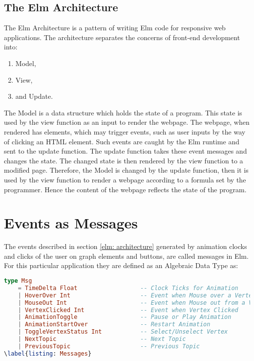 \subsection{The Elm Architecture}
\label{elm: architecture}
The Elm Architecture is a pattern of writing Elm code for responsive web
applications.  The architecture separates the concerns of front-end development
into:

\begin{enumerate}
\item Model,
\item View,
\item and Update.
\end{enumerate}

The Model is a data structure which holds the state of a program.
\cite{Fairbank19} This state is used by the view function as an input to
render the webpage.  The webpage, when rendered has elements, which may trigger
events, such as user inputs by the way of clicking an HTML element. Such events
are caught by the Elm runtime and sent to the update function.  The update
function takes these event messages and changes the state. The changed state is
then rendered by the view function to a modified page.  Therefore, the Model is
changed by the update function, then it is used by the view function to
render a webpage according to a formula set by the programmer. Hence the content
of the webpage reflects the state of the program.


\section{Events as Messages}
\label{impl: messages}
The events described in section \autoref{elm: architecture} generated by
animation clocks and clicks of the user on graph elements and buttons, are
called messages in Elm. For this particular
application they are defined as an Algebraic Data Type as:

\begin{lstlisting}[language=elm
                  , caption={
                              Abstract Data Type Msg with its Data Constructors.
                              These messages are dispached by buttons, graph vertices
                              system clocks and are received by the update function
                              to change the $Model$, which carries the state of the
                              program.
                  }
                  ]
type Msg
    = TimeDelta Float                  -- Clock Ticks for Animation
    | HoverOver Int                    -- Event when Mouse over a Vertex                              
    | MouseOut Int                     -- Event when Mouse out from a Vertex                               
    | VertexClicked Int                -- Event when Vertex Clicked                              
    | AnimationToggle                  -- Pause or Play Animation
    | AnimationStartOver               -- Restart Animation
    | ToggleVertexStatus Int           -- Select/Unselect Vertex
    | NextTopic                        -- Next Topic
    | PreviousTopic                    -- Previous Topic
\label{listing: Messages}
\end{lstlisting}

